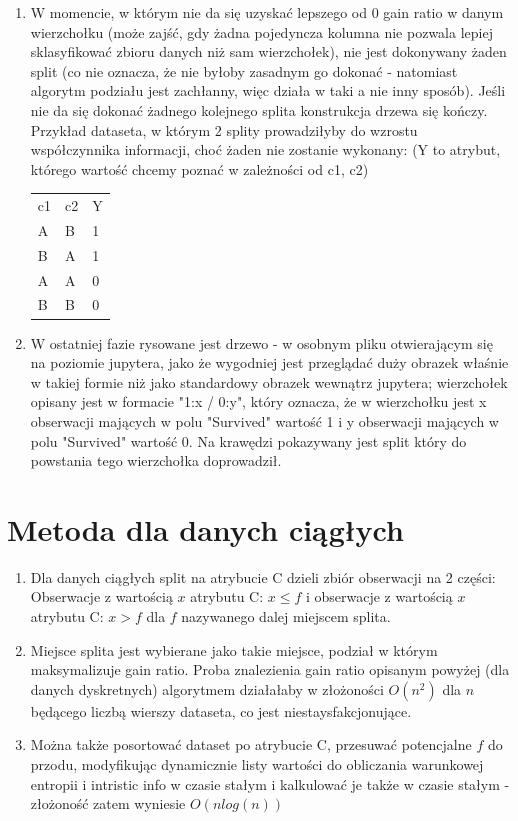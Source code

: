 \documentclass[12pt]{article}
\begin{document}
\begin{enumerate}
	\item W momencie, w którym nie da się uzyskać lepszego od 0 gain ratio w danym wierzchołku (może zajść, gdy żadna pojedyncza kolumna nie pozwala lepiej sklasyfikować zbioru danych niż sam wierzchołek), nie jest dokonywany żaden split (co nie oznacza, że nie byłoby zasadnym go dokonać - natomiast algorytm podziału jest zachłanny, więc działa w taki a nie inny sposób). Jeśli nie da się dokonać żadnego kolejnego splita konstrukcja drzewa się kończy. Przykład dataseta, w którym 2 splity prowadziłyby do wzrostu współczynnika informacji, choć żaden nie zostanie wykonany: (Y to atrybut, którego wartość chcemy poznać w zależności od c1, c2)\\
		\begin{tabular}{lll}
			c1 &  c2 &  Y \\
			A & B & 1 \\
			B & A & 1 \\
			A & A & 0 \\ 
			B & B & 0 \\ 
		\end{tabular}
	
	\item W ostatniej fazie rysowane jest drzewo - w osobnym pliku otwierającym się na poziomie jupytera, jako że wygodniej jest przeglądać duży obrazek właśnie w takiej formie niż jako standardowy obrazek wewnątrz jupytera; wierzchołek opisany jest w formacie "1:x / 0:y", który oznacza, że w wierzchołku jest x obserwacji mających w polu "Survived" wartość 1 i y obserwacji mających w polu "Survived" wartość 0. Na krawędzi pokazywany jest split który do powstania tego wierzchołka doprowadził.
\end{enumerate}

\section{Metoda dla danych ciągłych}
\begin{enumerate}
	\item Dla danych ciągłych split na atrybucie C dzieli zbiór obserwacji na 2 części: Obserwacje z wartością \(x\) atrybutu C: \(x \le f\) i obserwacje z wartością \(x\) atrybutu C: \(x > f\) dla \(f\) nazywanego dalej miejscem splita.
	\item Miejsce splita jest wybierane jako takie miejsce, podział w którym maksymalizuje gain ratio. Proba znalezienia gain ratio opisanym powyżej (dla danych dyskretnych) algorytmem działałaby w złożoności \(O(n^2)\) dla \(n\) będącego liczbą wierszy dataseta, co jest niestaysfakcjonujące.
	\item Można także posortować dataset po atrybucie C, przesuwać potencjalne \(f\) do przodu, modyfikując dynamicznie listy wartości do obliczania warunkowej entropii i intristic info w czasie stałym i kalkulować je także w czasie stałym - złożoność zatem wyniesie \(O(nlog(n))\)
\end{enumerate}
\end{document}
